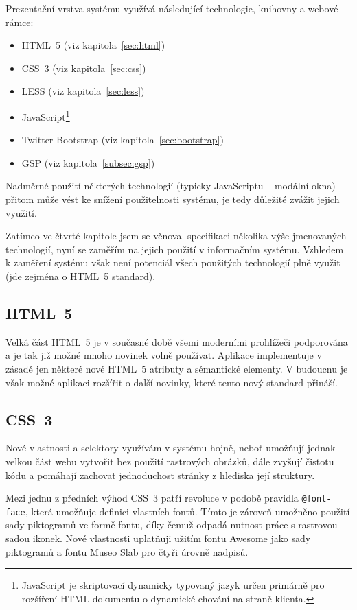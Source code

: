 Prezentační vrstva systému využívá následující technologie, knihovny a webové rámce:

\begin{itemize}
    \item HTML~5 (viz kapitola~\ref{sec:html})
    \item CSS~3 (viz kapitola~\ref{sec:css})
    \item LESS (viz kapitola~\ref{sec:less})
    \item JavaScript\footnote{JavaScript je skriptovací dynamicky typovaný jazyk určen primárně pro rozšíření HTML dokumentu o dynamické chování na straně klienta.}
    \item Twitter Bootstrap (viz kapitola~\ref{sec:bootstrap})
    \item GSP (viz kapitola~\ref{subsec:gsp})
\end{itemize}

Nadměrné použití některých technologií (typicky JavaScriptu -- modální okna) přitom může vést ke snížení použitelnosti systému, je tedy důležité zvážit jejich využití.

Zatímco ve čtvrté kapitole jsem se věnoval specifikaci několika výše jmenovaných technologií, nyní se zaměřím na jejich použití v informačním systému. Vzhledem k zaměření systému však není potenciál všech použitých technologií plně využit (jde zejména o HTML~5 standard).

\subsection{HTML~5}

Velká část HTML~5 je v současné době všemi moderními prohlížeči podporována a je tak již možné mnoho novinek volně používat. Aplikace implementuje v zásadě jen některé nové HTML~5 atributy a sémantické elementy. V budoucnu je však možné aplikaci rozšířit o další novinky, které tento nový standard přináší.

\subsection{CSS~3}

Nové vlastnosti a selektory využívám v systému hojně, neboť umožňují jednak velkou část webu vytvořit bez použití rastrových obrázků, dále zvyšují čistotu kódu a pomáhají zachovat jednoduchost stránky z hlediska její struktury.

Mezi jednu z předních výhod CSS~3 patří revoluce v podobě pravidla \texttt{@font-face}, která umožňuje definici vlastních fontů. Tímto je zároveň umožněno použití sady piktogramů ve formě fontu, díky čemuž odpadá nutnost práce s rastrovou sadou ikonek. Nové vlastnosti uplatňuji užitím fontu Awesome jako sady piktogramů a fontu Museo Slab pro čtyři úrovně nadpisů.

